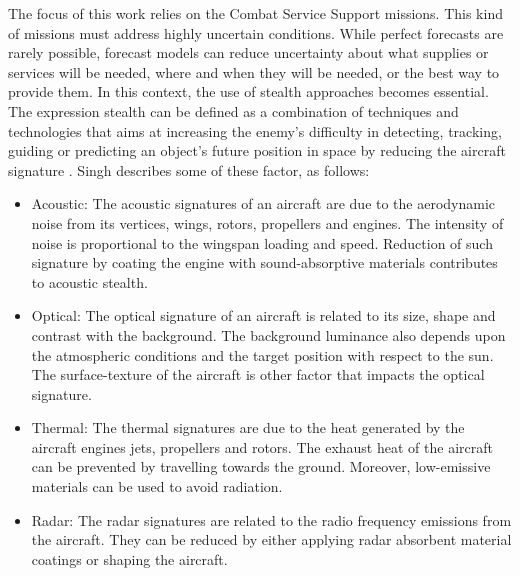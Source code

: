 The focus of this work relies on the Combat Service Support missions. This kind of missions must address highly uncertain conditions. While perfect forecasts are rarely possible, forecast models can reduce uncertainty about what supplies or services will be needed, where and when they will be needed, or the best way to provide them. In this context, the use of stealth approaches becomes essential. The expression stealth can be defined as a combination of techniques and technologies that aims at increasing the enemy's difficulty in detecting, tracking, guiding or predicting an object's future position in space by reducing the aircraft signature \cite{kacena1995}. Singh \cite{singh_2015} describes some of these factor, as follows:

\begin{itemize}
    \item Acoustic: The acoustic signatures of an aircraft are due to the aerodynamic noise from its vertices, wings, rotors, propellers and engines. The intensity of noise is proportional to the wingspan loading and speed. Reduction of such signature by coating the engine with sound-absorptive materials contributes to acoustic stealth.
    \item Optical: The optical signature of an aircraft is related to its size, shape and contrast with the background. The background luminance also depends upon the atmospheric conditions and the target position with respect to the sun. The surface-texture of the aircraft is other factor that impacts the optical signature.
    \item Thermal: The thermal signatures are due to the heat generated by the aircraft engines jets, propellers and rotors. The exhaust heat of the aircraft can be prevented by travelling towards the ground. Moreover, low-emissive materials can be used to avoid radiation. 
    \item Radar: The radar signatures are related to the radio frequency emissions from the aircraft. They can be reduced by either applying radar absorbent material coatings or shaping the aircraft. 
\end{itemize}


